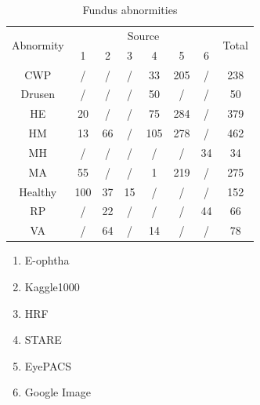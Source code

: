 \documentclass{article}
\begin{document}
	\begin{minipage}[t]{0.6\linewidth}
		{
			\fontsize{9}{12}\selectfont
			{
				\begin{longtable}{cccccccc}
					\caption{Fundus abnormities}
					\label{tb:Fundus_source}\\
					\toprule
					\multirow{2}{*}{Abnormity}&\multicolumn{6}{c}{Source}&\multirow{2}{*}{Total}\\
					&1&2&3&4&5&6&\\
					\midrule
					CWP    &/  &/ &/ &33 &205&/ &238\\
					Drusen &/  &/ &/ &50 &/  &/ &50 \\     
					HE     &20 &/ &/ &75 &284&/ &379\\ 
					HM     &13 &66&/ &105&278&/ &462\\     
					MH     &/  &/ &/ &/  &/  &34&34 \\        
					MA     &55 &/ &/ &1  &219&/ &275\\
					Healthy&100&37&15&/  &/  &/ &152\\      
					RP     &/  &22&/ &/  &/  &44&66 \\         
					VA     &/  &64&/ &14 &/  &/ &78 \\
					
					\bottomrule
				\end{longtable}
				
				\vspace{1cm}
				\begin{enumerate}
					
					\item E-ophtha
					\vspace{-0.2cm}
					
					\item Kaggle1000
					\vspace{-0.2cm}
					
					\item HRF
					\vspace{-0.2cm}
					
					\item STARE
					\vspace{-0.2cm}
					
					\item EyePACS
					\vspace{-0.2cm}
					
					\item Google Image
					\vspace{-0.2cm}
					
				\end{enumerate}
				
				\vspace{0.5cm}
			}
		}
	\end{minipage}
	
\end{document}
